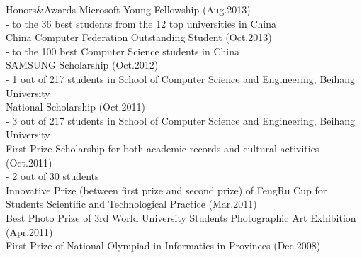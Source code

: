 \documentclass{resume} %
\begin{document}
\begin{rSection}{Honors\&Awards}
Microsoft Young Fellowship (Aug.2013) \\
\hspace*{8pt} - to the 36 best students from the 12 top universities in China \\
China Computer Federation Outstanding Student (Oct.2013) \\
\hspace*{8pt} - to the 100 best Computer Science students in China  \\
SAMSUNG Scholarship (Oct.2012) \\
\hspace*{8pt} - 1 out of 217 students in School of Computer Science and Engineering, Beihang University\\
National Scholarship (Oct.2011) \\
\hspace*{8pt} - 3 out of 217 students in School of Computer Science and Engineering, Beihang University\\
First Prize Scholarship for both academic records and cultural activities (Oct.2011) \\
\hspace*{8pt} - 2 out of 30 students \\
Innovative Prize (between first prize and second prize) of FengRu Cup for Students Scientific and Technological Practice (Mar.2011) \\
Best Photo Prize of 3rd World University Students Photographic Art Exhibition (Apr.2011) \\
First Prize of National Olympiad in Informatics in Provinces (Dec.2008)
\end{rSection}



\end{document}
